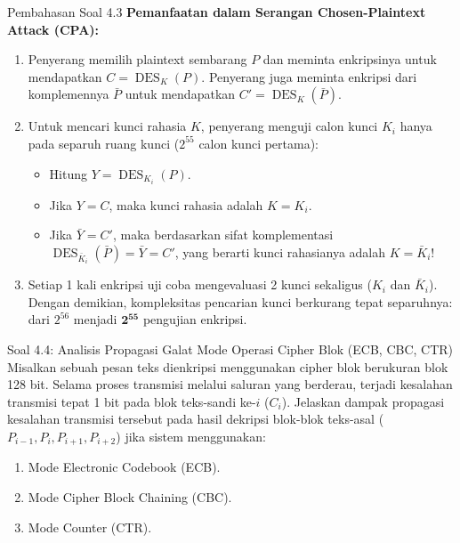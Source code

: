 \documentclass[11pt,a4paper]{article}
\begin{document}
\begin{solusibox}{Pembahasan Soal 4.3}
\textbf{Pemanfaatan dalam Serangan Chosen-Plaintext Attack (CPA):}
\begin{enumerate}[leftmargin=*]
    \item Penyerang memilih plaintext sembarang $P$ dan meminta enkripsinya untuk mendapatkan $C = \operatorname{DES}_K(P)$. Penyerang juga meminta enkripsi dari komplemennya $\bar{P}$ untuk mendapatkan $C' = \operatorname{DES}_K(\bar{P})$.
    \item Untuk mencari kunci rahasia $K$, penyerang menguji calon kunci $K_i$ hanya pada separuh ruang kunci ($2^{55}$ calon kunci pertama):
    \begin{itemize}
        \item Hitung $Y = \operatorname{DES}_{K_i}(P)$.
        \item Jika $Y = C$, maka kunci rahasia adalah $K = K_i$.
        \item Jika $\bar{Y} = C'$, maka berdasarkan sifat komplementasi $\operatorname{DES}_{\bar{K}_i}(\bar{P}) = \bar{Y} = C'$, yang berarti kunci rahasianya adalah $K = \bar{K}_i$!
    \end{itemize}
    \item Setiap 1 kali enkripsi uji coba mengevaluasi 2 kunci sekaligus ($K_i$ dan $\bar{K}_i$). Dengan demikian, kompleksitas pencarian kunci berkurang tepat separuhnya: dari $2^{56}$ menjadi $\mathbf{2^{55}}$ pengujian enkripsi.
\end{enumerate}
\end{solusibox}

\vspace{0.4cm}

\begin{soalbox}{Soal 4.4: Analisis Propagasi Galat Mode Operasi Cipher Blok (ECB, CBC, CTR)}
Misalkan sebuah pesan teks dienkripsi menggunakan cipher blok berukuran blok 128 bit.
Selama proses transmisi melalui saluran yang berderau, terjadi kesalahan transmisi tepat 1 bit pada blok teks-sandi ke-$i$ ($C_i$).
Jelaskan dampak propagasi kesalahan transmisi tersebut pada hasil dekripsi blok-blok teks-asal ($P_{i-1}, P_i, P_{i+1}, P_{i+2}$) jika sistem menggunakan:
\begin{enumerate}[label=(\alph*)]
    \item Mode Electronic Codebook (ECB).
    \item Mode Cipher Block Chaining (CBC).
    \item Mode Counter (CTR).
\end{enumerate}
\end{soalbox}
\end{document}
